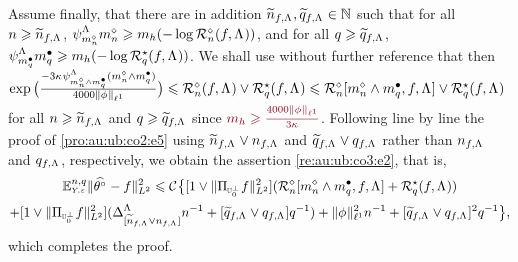 \begin{pro}
Assume finally, that there are in addition
$\widetilde{\ssY}_{\xdf,\iSv},\widetilde{\ssE}_{\xdf,\iSv}\in\Nz$ such
that for all $\ssY\geq\widetilde{\ssY}_{\xdf,\iSv}$,
$\cmiSv[\aDi{\ssY}]\aDi{\ssY}\geq \Di_{\ydf}(-\log\hRa{\xdf,\iSv})$, and for all
$\ssE\geq\widetilde{\ssE}_{\xdf,\iSv}$,
$\cmiSv[\sDi{\ssE}]\sDi{\ssE}\geq \Di_{\ydf}(-\log\mRa{\xdf,\iSv})$.
We shall use without further
reference that then $\exp\big(\tfrac{-3\cpen\cmiSv[\aDi{\ssY}\wedge\sDi{\ssE}](\aDi{\ssY}\wedge\sDi{\ssE})}{4000\Vnormlp[1]{\fydf}}\big)\leq\hRa{\xdf,\iSv}\vee\mRa{\xdf,\iSv}\leq\hRaDi{\aDi{\ssY}\wedge\sDi{\ssE},\xdf,\iSv}\vee\mRa{\xdf,\iSv}$ for
all $\ssY\geq\widetilde{\ssY}_{\xdf,\iSv}$ and $\ssE\geq\widetilde{\ssE}_{\xdf,\iSv}$
since $\dr \Di_{\ydf}\geq
\tfrac{4000\Vnormlp[1]{\fydf}}{3\cpen}$. Following line by line the
proof of \eqref{pro:au:ub:co2:e5} using
$\widetilde{\ssY}_{\xdf,\iSv}\vee\ssY_{\xdf,\iSv}$ and
$\widetilde{\ssE}_{\xdf,\iSv}\vee\ssE_{\xdf,\iSv}$ rather than
$\ssY_{\xdf,\iSv}$ and $\ssE_{\xdf,\iSv}$, respectively, we obtain the
assertion \eqref{re:au:ub:co3:e2}, that is,
\begin{multline}\label{pro:au:ub:co3:e4}
\FuEx[\ssY,\ssE]{\rY,\rE}\VnormLp{\hxdfPr[]-\xdf}^2\leq
\cst{}\big\{[1\vee\VnormLp{\Proj[{\mHiH[0]^\perp}]\xdf}^2](\hRaDi{\aDi{\ssY}\wedge\sDi{\ssE},\xdf,\iSv}+\mRa{\xdf,\iSv})\\
\hfill+[1\vee\VnormLp{\Proj[{\mHiH[0]^\perp}]\xdf}^2](\DipenSv[{[\widetilde{\ssY}_{\xdf,\iSv}\vee\ssY_{\xdf,\iSv}]}]\ssY^{-1}+[\widetilde{\ssE}_{\xdf,\iSv}\vee\ssE_{\xdf,\iSv}]\ssE^{-1})+\Vnormlp[1]{\fydf}^2\ssY^{-1}+[\widetilde{\ssE}_{\xdf,\iSv}\vee\ssE_{\xdf,\iSv}]^2\ssE^{-1}\big\},
\end{multline}
which completes the proof.\end{pro}
